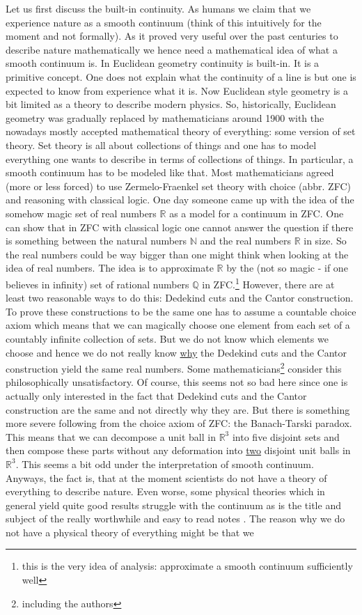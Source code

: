 Let us first discuss the {\glqq}built-in continuity{\grqq}. As humans we claim that we experience nature as a smooth continuum (think of this intuitively for the moment and not formally). As it proved very useful over the past centuries to describe nature mathematically we hence need a mathematical idea of what a smooth continuum is. In Euclidean geometry continuity is built-in. It is a primitive concept. One does not explain what the continuity of a line is but one is expected to know from experience what it is. Now Euclidean style geometry is a bit limited as a theory to describe modern physics. So, historically, Euclidean geometry was gradually replaced by mathematicians around 1900 with the nowadays mostly accepted mathematical theory of everything: some version of set theory. Set theory is all about collections of things and one has to model everything one wants to describe in terms of collections of things. In particular, a smooth continuum has to be modeled like that. Most mathematicians agreed (more or less forced) to use Zermelo-Fraenkel set theory with choice (abbr. ZFC) and reasoning with classical logic. One day someone came up with the idea of the somehow magic set of real numbers $\mathbb{R}$ as a model for a continuum in ZFC. One can show that in ZFC with classical logic one cannot answer the question if there is something between the natural numbers $\mathbb{N}$ and the real numbers $\mathbb{R}$ in size. So the real numbers could be way bigger than one might think when looking at the idea of real numbers. The idea is to approximate $\mathbb{R}$ by the (not so magic - if one believes in infinity) set of rational numbers $\mathbb{Q}$ in ZFC.\footnote{this is the very idea of analysis: approximate a smooth continuum sufficiently well} However, there are at least two reasonable ways to do this: Dedekind cuts and the Cantor construction. To prove these constructions to be the same one has to assume a countable choice axiom which means that we can magically choose one element from each set of a countably infinite collection of sets. But we do not know which elements we choose and hence we do not really know \underline{why} the Dedekind cuts and the Cantor construction yield the same real numbers. Some mathematicians\footnote{including the authors} consider this philosophically unsatisfactory. Of course, this seems not so bad here since one is actually only interested in the fact that Dedekind cuts and the Cantor construction are the same and not directly why they are. But there is something more severe following from the choice axiom of ZFC: the Banach-Tarski paradox. This means that we can decompose a unit ball in $\mathbb{R}^{3}$ into five disjoint sets and then compose these parts without any {\glqq}deformation{\grqq} into \underline{two} disjoint unit balls in $\mathbb{R}^{3}$. This seems a bit odd under the interpretation of smooth continuum. Anyways, the fact is, that at the moment scientists do not have a theory of everything to describe nature. Even worse, some physical theories which in general yield quite good results struggle with the continuum as is the title and subject of the really worthwhile and easy to read notes \cite{476fe2a3}. The reason why we do not have a physical theory of everything might be that we 